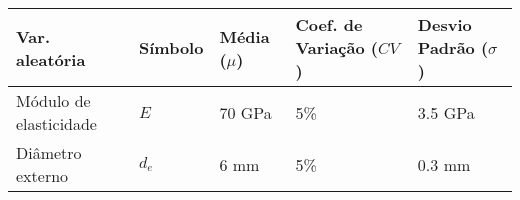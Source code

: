 \begin{longtable}[]{@{}lllll@{}}
\toprule
\begin{minipage}[b]{0.21\columnwidth}\raggedright
Var. aleatória\strut
\end{minipage} & \begin{minipage}[b]{0.08\columnwidth}\raggedright
Símbolo\strut
\end{minipage} & \begin{minipage}[b]{0.13\columnwidth}\raggedright
Média (\(\mu\))\strut
\end{minipage} & \begin{minipage}[b]{0.22\columnwidth}\raggedright
Coef. de Variação (\(CV\))\strut
\end{minipage} & \begin{minipage}[b]{0.22\columnwidth}\raggedright
Desvio Padrão (\(\sigma\))\strut
\end{minipage}\tabularnewline
\midrule
\endhead
\begin{minipage}[t]{0.21\columnwidth}\raggedright
Módulo de elasticidade\strut
\end{minipage} & \begin{minipage}[t]{0.08\columnwidth}\raggedright
\(E\)\strut
\end{minipage} & \begin{minipage}[t]{0.13\columnwidth}\raggedright
70 GPa\strut
\end{minipage} & \begin{minipage}[t]{0.22\columnwidth}\raggedright
5\%\strut
\end{minipage} & \begin{minipage}[t]{0.22\columnwidth}\raggedright
3.5 GPa\strut
\end{minipage}\tabularnewline
\begin{minipage}[t]{0.21\columnwidth}\raggedright
Diâmetro externo\strut
\end{minipage} & \begin{minipage}[t]{0.08\columnwidth}\raggedright
\(d_e\)\strut
\end{minipage} & \begin{minipage}[t]{0.13\columnwidth}\raggedright
6 mm\strut
\end{minipage} & \begin{minipage}[t]{0.22\columnwidth}\raggedright
5\%\strut
\end{minipage} & \begin{minipage}[t]{0.22\columnwidth}\raggedright
0.3 mm\strut
\end{minipage}\tabularnewline

\end{longtable}
